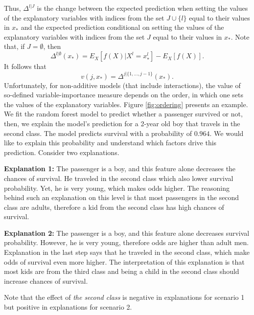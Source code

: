 \documentclass[12pt,]{krantz}
\begin{document}
Thus, \(\Delta^{l|J}\) is the change between the expected prediction when setting the values of the explanatory variables with indices from the set \(J \cup \{l\}\) equal to their values in \(x_*\) and the expected prediction conditional on setting the values of the explanatory variables with indices from the set \(J\) equal to their values in \(x_*\). Note that, if \(J=\emptyset\), then
\[
\Delta^{l|\emptyset}(x_*) = E_X[f(X) | X^{l} = x_*^{l}] - E_X[f(X)].
\]
It follows that
\[
v(j, x_*) = \Delta^{j|\{1,  ..., j-1\}}(x_*).
\]
Unfortunately, for non-additive models (that include interactions), the value of so-defined variable-importance measure depends on the order, in which one sets the values of the explanatory variables. Figure \ref{fig:ordering} presents an example.
We fit the random forest model to predict whether a passenger survived or not, then, we explain the model's prediction for a 2-year old boy that travels in the second class. The model predicts survival with a probability of \(0.964\). We would like to explain this probability and understand which factors drive this prediction. Consider two explanations.

\textbf{Explanation 1:}
The passenger is a boy, and this feature alone decreases the chances of survival. He traveled in the second class which also lower survival probability.
Yet, he is very young, which makes odds higher. The reasoning behind such an explanation on this level is that most passengers in the second class are adults, therefore a kid from the second class has high chances of survival.

\textbf{Explanation 2:}
The passenger is a boy, and this feature alone decreases survival probability.
However, he is very young, therefore odds are higher than adult men. Explanation in the last step says that he traveled in the second class, which make odds of survival even more higher. The interpretation of this explanation is that most kids are from the third class and being a child in the second class should increase chances of survival.

Note that the effect of \emph{the second class} is negative in explanations for scenario 1 but positive in explanations for scenario 2.
\end{document}
